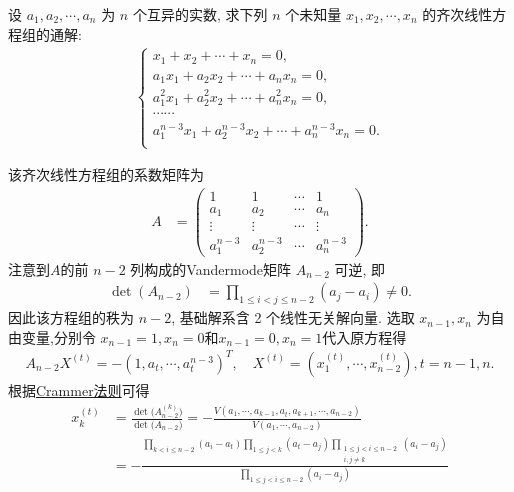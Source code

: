\documentclass[../../main.tex]{subfiles}%
\begin{document}
\begin{example}
设 \(a_1, a_2, \cdots, a_n\) 为 \(n\) 个互异的实数, 求下列 \(n\) 个未知量 \(x_1, x_2, \cdots, x_n\) 的齐次线性方程组的通解:
\begin{align*}
\begin{cases}
x_1+x_2+\cdots +x_n=0,\\
a_1x_1+a_2x_2+\cdots +a_nx_n=0,\\
a_{1}^{2}x_1+a_{2}^{2}x_2+\cdots +a_{n}^{2}x_n=0,\\
\cdots \cdots\\
a_{1}^{n-3}x_1+a_{2}^{n-3}x_2+\cdots +a_{n}^{n-3}x_n=0.\\
\end{cases}
\end{align*}
\end{example}
\begin{solution}
该齐次线性方程组的系数矩阵为
\begin{align*}
A &= \begin{pmatrix}
1 & 1 & \cdots & 1 \\
a_1 & a_2 & \cdots & a_n \\
\vdots & \vdots & \cdots & \vdots \\
a_1^{n-3} & a_2^{n-3} & \cdots & a_n^{n-3}
\end{pmatrix}.
\end{align*}
注意到$A$的前 \(n-2\) 列构成的Vandermode矩阵 \(A_{n-2}\) 可逆, 即
\begin{align*}
\det(A_{n-2}) &= \prod\limits_{1 \le i < j \le n-2} (a_j - a_i) \neq 0.
\end{align*}
因此该方程组的秩为 \(n-2\), 基础解系含 2 个线性无关解向量. 选取 \(x_{n-1}, x_n\) 为自由变量,分别令 \(x_{n-1}=1, x_n=0\)和\(x_{n-1}=0, x_n=1\)代入原方程得
\begin{align*}
A_{n-2}X^{(t)}=-(1, a_t, \cdots, a_t^{n-3})^T,\quad X^{(t)}=(x_1^{(t)},\cdots,x_{n-2}^{(t)}),t=n-1,n.
\end{align*}
根据\hyperref[theorem:Crammer法则]{Crammer法则}可得
\begin{align*}
x_{k}^{(t)}&=\frac{\det\mathrm{(}A_{n-2}^{(k)})}{\det\mathrm{(}A_{n-2})}=-\frac{V(a_1,\cdots ,a_{k-1},a_t,a_{k+1},\cdots ,a_{n-2})}{V(a_1,\cdots ,a_{n-2})}
\\
&=-\frac{\prod\limits_{k<i\leqslant n-2}{\left( a_i-a_t \right)}\prod\limits_{1\leqslant j<k}{\left( a_t-a_j \right)}\prod\limits_{\substack{1\leqslant j<i\leqslant n-2 \\ i,j\ne k}}{\left( a_i-a_j \right)}}{\prod\limits_{1\leqslant j<i\leqslant n-2}{\left( a_i-a_j \right)}}

\end{align*}
\end{solution}
\end{document}
